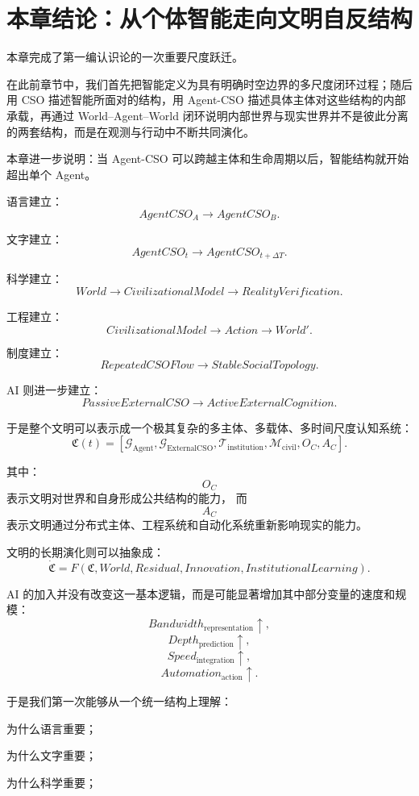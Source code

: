 \section{本章结论：从个体智能走向文明自反结构}

本章完成了第一编认识论的一次重要尺度跃迁。

在此前章节中，我们首先把智能定义为具有明确时空边界的多尺度闭环过程；随后用 CSO 描述智能所面对的结构，用 Agent-CSO 描述具体主体对这些结构的内部承载，再通过 World--Agent--World 闭环说明内部世界与现实世界并不是彼此分离的两套结构，而是在观测与行动中不断共同演化。

本章进一步说明：当 Agent-CSO 可以跨越主体和生命周期以后，智能结构就开始超出单个 Agent。

语言建立：
\[
AgentCSO_A
\rightarrow
AgentCSO_B.
\]

文字建立：
\[
AgentCSO_t
\rightarrow
AgentCSO_{t+\Delta T}.
\]

科学建立：
\[
World
\rightarrow
CivilizationalModel
\rightarrow
RealityVerification.
\]

工程建立：
\[
CivilizationalModel
\rightarrow
Action
\rightarrow
World'.
\]

制度建立：
\[
RepeatedCSOFlow
\rightarrow
StableSocialTopology.
\]

AI 则进一步建立：
\[
PassiveExternalCSO
\rightarrow
ActiveExternalCognition.
\]

于是整个文明可以表示成一个极其复杂的多主体、多载体、多时间尺度认知系统：
\[
\mathfrak C(t)
=
\left[
\mathcal G_{\mathrm{Agent}},
\mathcal G_{\mathrm{ExternalCSO}},
\mathcal T_{\mathrm{institution}},
\mathcal M_{\mathrm{civil}},
O_C,
A_C
\right].
\]

其中：
\[
O_C
\]
表示文明对世界和自身形成公共结构的能力，
而
\[
A_C
\]
表示文明通过分布式主体、工程系统和自动化系统重新影响现实的能力。

文明的长期演化则可以抽象成：
\[
\boxed{
\dot{\mathfrak C}
=
F(
\mathfrak C,
World,
Residual,
Innovation,
InstitutionalLearning
).
}
\]

AI 的加入并没有改变这一基本逻辑，而是可能显著增加其中部分变量的速度和规模：
\[
Bandwidth_{\mathrm{representation}}\uparrow,
\]
\[
Depth_{\mathrm{prediction}}\uparrow,
\]
\[
Speed_{\mathrm{integration}}\uparrow,
\]
\[
Automation_{\mathrm{action}}\uparrow.
\]

于是我们第一次能够从一个统一结构上理解：

为什么语言重要；

为什么文字重要；

为什么科学重要；

